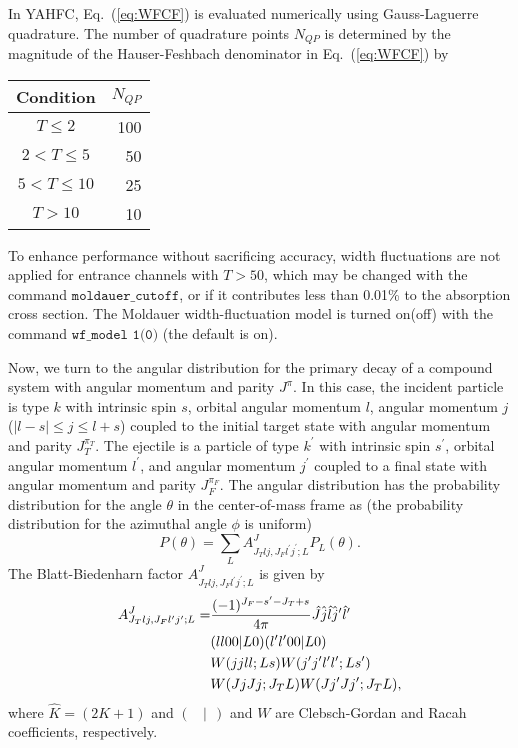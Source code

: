 \documentclass[
10pt,
showpacs,preprintnumbers,footinbib,
amsfonts,amsmath,amssymb,
aps,
prc,twocolumn,groupedaddress,superscriptaddress,
showkeys,
nofootinbib
]{revtex4-1}
\begin{document}
In YAHFC, Eq.~(\ref{eq:WFCF}) is evaluated numerically using Gauss-Laguerre quadrature. The number of quadrature points $N_{QP}$ is determined by the magnitude of the Hauser-Feshbach denominator in Eq.~(\ref{eq:WFCF}) by
\begin{center}
\begin{tabular}{| c | r | }
\hline
Condition & $N_{QP}$ \\
\hline
$T \le 2$ & 100\\
$2< T \le 5$ & 50\\
$5< T \le 10$ & 25\\
$T > 10$ & 10\\
\hline
\end{tabular}
\end{center}
To enhance performance without sacrificing accuracy, width fluctuations are not applied for entrance channels with $T>50$, which may be changed with the command ${\texttt{moldauer\_cutoff}}$, or if it contributes less than 0.01\% to the absorption cross section. The Moldauer width-fluctuation model is turned on(off) with the command ${\texttt{wf\_model 1(0)}}$ (the default is on). 

Now, we turn to the angular distribution for the primary decay of a compound system with angular momentum and parity $J^\pi$. In this case, the incident particle is type  $k$ with intrinsic spin $s$, orbital angular momentum $l$, angular momentum $j$ ($|l-s| \le j \le l+s$) coupled to the initial target state with angular momentum and parity $J_T^{\pi_T}$. The ejectile is a particle of type $k^\prime$ with intrinsic spin $s^\prime$, orbital angular momentum $l^\prime$, and angular momentum $j^\prime$ coupled to a final state with angular momentum and parity $J_F^{\pi_F}$. The angular distribution has the probability distribution for the angle $\theta$ in the center-of-mass frame as (the probability distribution for the azimuthal angle $\phi$ is uniform)
\begin{equation}
P(\theta) = \sum_L A^J_{J_Tlj,J_Fl^\prime j^\prime ;L} P_L(\theta).
\end{equation}
The Blatt-Biedenharn factor $A^J_{J_Tlj,J_Fl^\prime j^\prime ;L}$ is given by
\begin{align}
A^J_{J_Tlj,J_Fl^\prime j^\prime ;L} = & \frac{(-1)^{J_F-s^\prime-J_T+s}}{4\pi} \hat J \hat j \hat l \hat j^\prime \hat l^\prime \notag\\
 & (ll00|L0)(l^\prime l^\prime 00|L0)\notag\\
 & W(jjll;Ls)W(j^\prime j^\prime l^\prime l^\prime; L s^\prime) \notag \\
 & W(JjJj;J_TL) W(Jj^\prime Jj^\prime ;J_TL),
 \label{eq:Pri-Ang}
\end{align}
where $\hat K = (2K+1)$ and $(~~~~|~~)$ and $W$ are Clebsch-Gordan and Racah coefficients, respectively.
\end{document}
